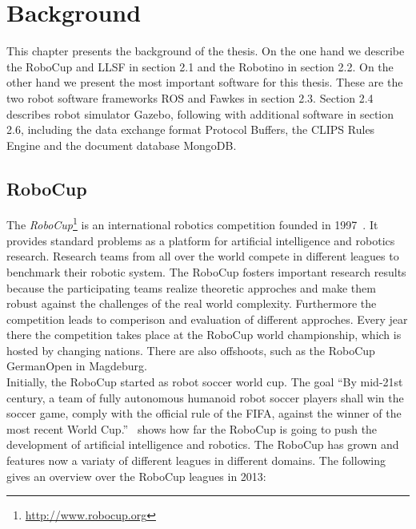 \chapter{Background}
This chapter presents the background of the thesis. On the one hand we describe the RoboCup and LLSF in section 2.1 and the Robotino in section 2.2. On the other hand we present the most important software for this thesis. These are the two robot software frameworks ROS and Fawkes in section 2.3. Section 2.4 describes robot simulator Gazebo, following with additional software in section 2.6, including the data exchange format Protocol Buffers, the CLIPS Rules Engine and the document database MongoDB.

\section{RoboCup}
The \textit{RoboCup}\footnote{\url{http://www.robocup.org}} is an international robotics competition founded in 1997~\cite{Robocup}. It provides standard problems as a platform for artificial intelligence and robotics research. Research teams from all over the world compete in different leagues to benchmark their robotic system. The RoboCup fosters important research results because the participating teams realize theoretic approches and make them robust against the challenges of the real world complexity. Furthermore the competition leads to comperison and evaluation of different approches. Every jear there the competition takes place at the RoboCup world championship, which is hosted by changing nations. There are also offshoots, such as the RoboCup GermanOpen in Magdeburg.\\
Initially, the RoboCup started as robot soccer world cup. The goal ``By mid-21st century, a team of fully autonomous humanoid robot soccer players shall win the soccer game, comply with the official rule of the FIFA, against the winner of the most recent World Cup.''~\cite{robocup_goal} shows how far the RoboCup is going to push the development of artificial intelligence and robotics. The RoboCup has grown and features now a variaty of different leagues in different domains. The following gives an overview over the RoboCup leagues in 2013:\\
